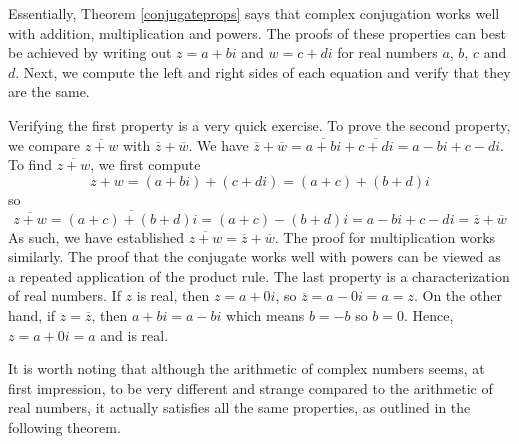 \medskip

Essentially, Theorem \ref{conjugateprops} says that complex conjugation works well with addition, multiplication and powers.  The proofs of these properties can best be achieved by writing out $z = a+bi$ and $w = c+di$ for real numbers $a$, $b$, $c$ and $d$.   Next, we compute the left and right sides of each equation and verify that they are the same.  

\smallskip

Verifying the first property is a very quick exercise.  To prove the second property, we compare $\overline{z+w}$ with $\overline{z} + \overline{w}$.  We have $\overline{z} + \overline{w} = \overline{a+bi} + \overline{c+di}  = a-bi + c-di$.  To find $\overline{z+w}$, we first compute 
\[
z+w = (a+bi) + (c+di) = (a+c)+(b+d)i
\]
 so 
\[
 \overline{z+w} = \overline{(a+c)+(b+d)i} = (a+c) - (b+d)i = a - bi + c - di = \overline{z} + \overline{w}
\]  
 As such, we have established  $\overline{z+w} = \overline{z}+\overline{w}$. The proof for multiplication works similarly.  The proof that the conjugate works well with powers can be viewed as a repeated application of the product rule.   The last property is a characterization of real numbers.  If $z$ is real, then $z = a + 0i$, so $\overline{z} = a - 0i = a = z$.  On the other hand, if $z=\overline{z}$, then $a+bi = a - bi$ which means $b=-b$ so $b=0$.  Hence, $z = a +0i = a$ and is real.


\medskip

It is worth noting that although the arithmetic of complex numbers seems, at first impression, to be very different and strange compared to the arithmetic of real numbers, it actually satisfies all the same properties, as outlined in the following theorem.


\smallskip

